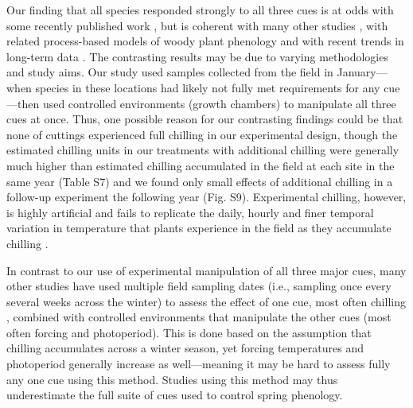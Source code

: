 \documentclass[11pt]{article}
\begin{document}
Our finding that all species responded strongly to all three cues is at odds with some recently published work \citep{Basler:2012aa,laube2014gcb,zohner2016ncc}, but is coherent with many other studies \citep[e.g.,][]{Worrall:1967aa,Heide:1993b}, with related process-based models of woody plant phenology \citep{Chuine:2000,chuine2016} and with recent trends in long-term data \citep[e.g,][]{fu2015,carter2017}. The contrasting results may be due to varying methodologies and study aims. Our study used samples collected from the field in January---when species in these locations had likely not fully met requirements for any cue---then used controlled environments (growth chambers) to manipulate all three cues at once. Thus, one possible reason for our contrasting findings could be that none of cuttings experienced full chilling in our experimental design, though the estimated chilling units in our treatments with additional chilling were generally much higher than estimated chilling accumulated in the field at each site in the same year (Table S7) and we found only small effects of additional chilling in a follow-up experiment the following year (Fig. S9). Experimental chilling, however, is highly artificial and fails to replicate the daily, hourly and finer temporal variation in temperature that plants experience in the field as they accumulate chilling \citep{Erez:1988,Luedeling:2009}. 

In contrast to our use of experimental manipulation of all three major cues, many other studies have used multiple field sampling dates (i.e., sampling once every several weeks across the winter) to assess the effect of one cue, most often chilling \citep{weinberger,laube2014gcb,zohner2017}, combined with controlled environments that manipulate the other cues (most often forcing and photoperiod). This is done based on the assumption that chilling accumulates across a winter season, yet forcing temperatures and photoperiod generally increase as well---meaning it may be hard to assess fully any one cue using this method. Studies using this method may thus underestimate the full suite of cues used to control spring phenology. 
\end{document}
